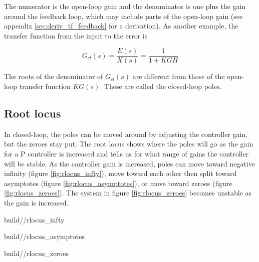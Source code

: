 The numerator is the \gls{open-loop gain} and the denominator is one plus the
gain around the feedback loop, which may include parts of the
\gls{open-loop gain} (see appendix \ref{sec:deriv_tf_feedback} for a
derivation). As another example, the transfer function from the input to the
\gls{error} is

\begin{equation}
  G_{cl}(s) = \frac{E(s)}{X(s)} = \frac{1}{1 + KGH}
\end{equation}

The roots of the denominator of $G_{cl}(s)$ are different from those of the
open-loop transfer function $KG(s)$. These are called the closed-loop poles.

\subsection{Root locus}
\label{subsec:root_locus}

In closed-loop, the poles can be moved around by adjusting the controller gain,
but the zeroes stay put. The root locus shows where the poles will go as the
gain for a P controller is increased and tells us for what range of gains the
controller will be stable. As the controller gain is increased, poles can move
toward negative infinity (figure \ref{fig:rlocus_infty}), move toward each other
then split toward asymptotes (figure \ref{fig:rlocus_asymptotes}), or move
toward zeroes (figure \ref{fig:rlocus_zeroes}). The \gls{system} in figure
\ref{fig:rlocus_zeroes} becomes unstable as the gain is increased.

\begin{bookfigure}
  \begin{minisvg}{2}{build/\chapterpath/rlocus_infty}
    \caption{Root locus showing pole moving toward negative infinity}
    \label{fig:rlocus_infty}
  \end{minisvg}
  \hfill
  \begin{minisvg}{2}{build/\chapterpath/rlocus_asymptotes}
    \caption{Root locus showing poles moving toward asymptotes}
    \label{fig:rlocus_asymptotes}
  \end{minisvg}
  \hfill
  \begin{minisvg}{2}{build/\chapterpath/rlocus_zeroes}
    \caption{Root locus of equation \eqref{eq:transfer_func} showing poles
      moving toward zeroes.}
    \label{fig:rlocus_zeroes}
  \end{minisvg}
\end{bookfigure}

